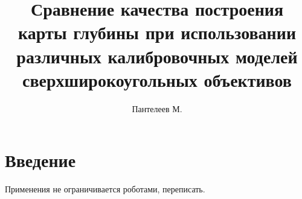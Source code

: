 

\raggedbottom
%


\title{Сравнение качества построения карты глубины при использовании различных калибровочных моделей сверхширокоугольных объективов}
\author{Пантелеев М.}
\maketitle

\begin{abstract}

\end{abstract}

\section{Введение}

Применения не ограничивается роботами, переписать.

